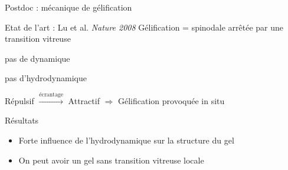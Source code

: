 \begin{frame}{Postdoc : mécanique de gélification}
\begin{block}{Etat de l'art : Lu et al. \textit{Nature 2008}}
Gélification = spinodale arrêtée par une transition vitreuse 
\begin{description}[Simulations]
\item[Experiences] pas de dynamique
\item[Simulations] pas d'hydrodynamique
\end{description}
\end{block}

Répulsif $\xrightarrow{\text{écrantage}}$ Attractif $\Rightarrow$ Gélification provoquée in situ
\begin{block}{Résultats}
\begin{itemize}
\item Forte influence de l'hydrodynamique sur la structure du gel
\item On peut avoir un gel sans transition vitreuse locale
\end{itemize}
\end{block}


\end{frame}
